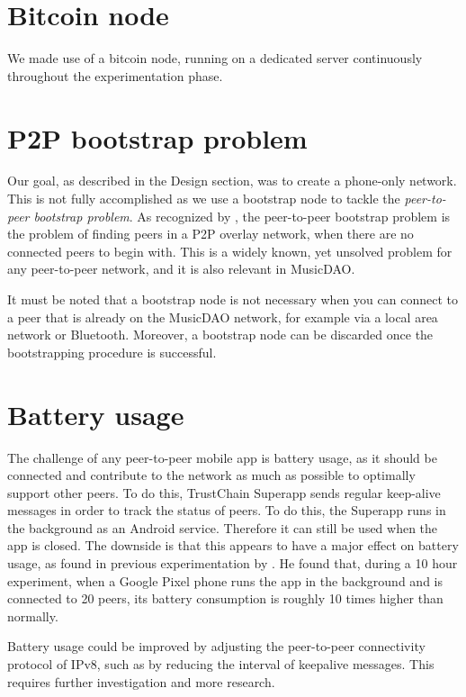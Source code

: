 \section{Bitcoin node}
We made use of a bitcoin node, running on a dedicated server continuously throughout the experimentation phase.

\section{P2P bootstrap problem}
Our goal, as described in the Design section, was to create a phone-only network. This is not fully accomplished as we use a bootstrap node to tackle the \textit{peer-to-peer bootstrap problem}. As recognized by \cite{wolinsky2010addressing}, the peer-to-peer bootstrap problem is the problem of finding peers in a P2P overlay network, when there are no connected peers to begin with. This is a widely known, yet unsolved problem for any peer-to-peer network, and it is also relevant in MusicDAO. 

It must be noted that a bootstrap node is not necessary when you can connect to a peer that is already on the MusicDAO network, for example via a local area network or Bluetooth. Moreover, a bootstrap node can be discarded once the bootstrapping procedure is successful.

\section{Battery usage}
The challenge of any peer-to-peer mobile app is battery usage, as it should be connected and contribute to the network as much as possible to optimally support other peers. To do this, TrustChain Superapp sends regular keep-alive messages in order to track the status of peers. To do this, the Superapp runs in the background as an Android service. Therefore it can still be used when the app is closed. The downside is that this appears to have a major effect on battery usage, as found in previous experimentation by \cite{mattskala2020}. He found that, during a 10 hour experiment, when a Google Pixel phone runs the app in the background and is connected to 20 peers, its battery consumption is roughly 10 times higher than normally. 

Battery usage could be improved by adjusting the peer-to-peer connectivity protocol of IPv8, such as by reducing the interval of keepalive messages. This requires further investigation and more research.

